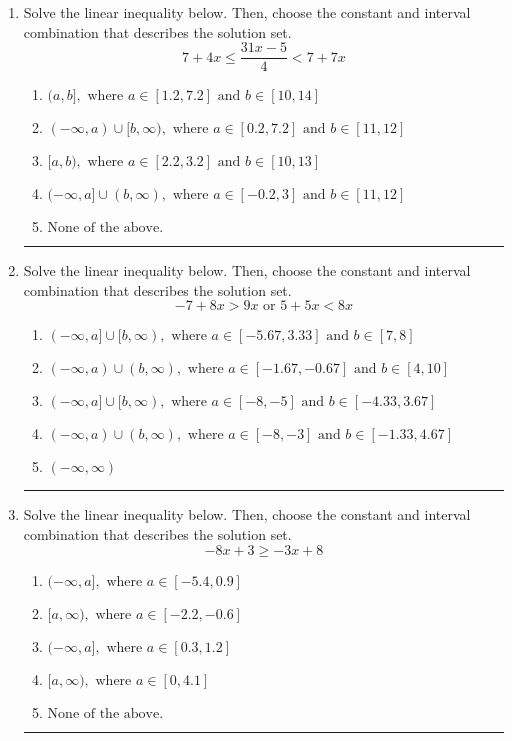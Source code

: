 \documentclass[14pt]{extbook}
\newcommand{\litem}[1]{\item#1\hspace*{-1cm}\rule{\textwidth}{0.4pt}}
\begin{document}
\begin{enumerate}
{\begin{enumerate}[label=\Alph*.]
\end{enumerate} }
\litem{
Solve the linear inequality below. Then, choose the constant and interval combination that describes the solution set.\[ 7 + 4 x \leq \frac{31 x - 5}{4} < 7 + 7 x \]\begin{enumerate}[label=\Alph*.]
\item \( (a, b], \text{ where } a \in [1.2, 7.2] \text{ and } b \in [10, 14] \)
\item \( (-\infty, a) \cup [b, \infty), \text{ where } a \in [0.2, 7.2] \text{ and } b \in [11, 12] \)
\item \( [a, b), \text{ where } a \in [2.2, 3.2] \text{ and } b \in [10, 13] \)
\item \( (-\infty, a] \cup (b, \infty), \text{ where } a \in [-0.2, 3] \text{ and } b \in [11, 12] \)
\item \( \text{None of the above.} \)

\end{enumerate} }
\litem{
Solve the linear inequality below. Then, choose the constant and interval combination that describes the solution set.\[ -7 + 8 x > 9 x \text{ or } 5 + 5 x < 8 x \]\begin{enumerate}[label=\Alph*.]
\item \( (-\infty, a] \cup [b, \infty), \text{ where } a \in [-5.67, 3.33] \text{ and } b \in [7, 8] \)
\item \( (-\infty, a) \cup (b, \infty), \text{ where } a \in [-1.67, -0.67] \text{ and } b \in [4, 10] \)
\item \( (-\infty, a] \cup [b, \infty), \text{ where } a \in [-8, -5] \text{ and } b \in [-4.33, 3.67] \)
\item \( (-\infty, a) \cup (b, \infty), \text{ where } a \in [-8, -3] \text{ and } b \in [-1.33, 4.67] \)
\item \( (-\infty, \infty) \)

\end{enumerate} }
\litem{
Solve the linear inequality below. Then, choose the constant and interval combination that describes the solution set.\[ -8x + 3 \geq -3x + 8 \]\begin{enumerate}[label=\Alph*.]
\item \( (-\infty, a], \text{ where } a \in [-5.4, 0.9] \)
\item \( [a, \infty), \text{ where } a \in [-2.2, -0.6] \)
\item \( (-\infty, a], \text{ where } a \in [0.3, 1.2] \)
\item \( [a, \infty), \text{ where } a \in [0, 4.1] \)
\item \( \text{None of the above}. \)


\end{enumerate}}
\end{enumerate}
\end{document}

